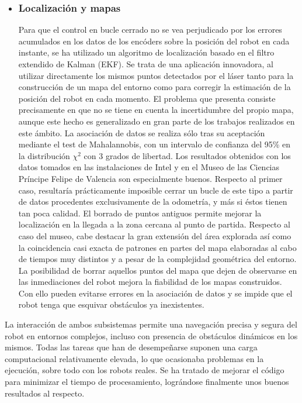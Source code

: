 \begin{itemize}
  \item \subsubsection{Localización y mapas}
  Para que el control en bucle cerrado no se vea perjudicado por los errores acumulados en los datos de los encóders sobre la posición del robot en cada instante, se ha utilizado un algoritmo de localización basado en el filtro extendido de Kalman (EKF). Se trata de una aplicación innovadora, al utilizar directamente los mismos puntos detectados por el láser tanto para la construcción de un mapa del entorno como para corregir la estimación de la posición del robot en cada momento. El problema que presenta consiste precisamente en que no se tiene en cuenta la incertidumbre del propio mapa, aunque este hecho es generalizado en gran parte de los trabajos realizados en este ámbito. La asociación de datos se realiza sólo tras su aceptación mediante el test de Mahalannobis, con un intervalo de confianza del 95\% en la distribución $\chi^{2}$ con 3 grados de libertad. Los resultados obtenidos con los datos tomados en las instalaciones de Intel y en el Museo de las Ciencias Príncipe Felipe de Valencia son especialmente buenos. Respecto al primer caso, resultaría prácticamente imposible cerrar un bucle de este tipo a partir de datos procedentes exclusivamente de la odometría, y más si éstos tienen tan poca calidad. El borrado de puntos antiguos permite mejorar la localización en la llegada a la zona cercana al punto de partida. Respecto al caso del museo, cabe destacar la gran extensión del área explorada así como la coincidencia casi exacta de patrones en partes del mapa elaboradas al cabo de tiempos muy distintos y a pesar de la complejidad geométrica del entorno. La posibilidad de borrar aquellos puntos del mapa que dejen de observarse en las inmediaciones del robot mejora la fiabilidad de los mapas construidos. Con ello pueden evitarse errores en la asociación de datos y se impide que el robot tenga que esquivar obstáculos ya inexistentes.

\end{itemize}

La interacción de ambos subsistemas permite una navegación precisa y segura del robot en entornos complejos, incluso con presencia de obstáculos dinámicos en los mismos. Todas las tareas que han de desempeñarse suponen una carga computacional relativamente elevada, lo que ocasionaba problemas en la ejecución, sobre todo con los robots reales. Se ha tratado de mejorar el código para minimizar el tiempo de procesamiento, lográndose finalmente unos buenos resultados al respecto.

